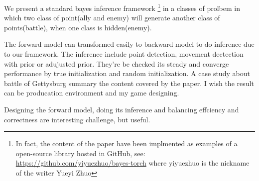 \documentclass{article}
\begin{document}
We present a standard bayes inference framework 
\footnote{In fact, the content of the paper have been implmented as examples of a open-source library
hosted in GitHub, see: \url{https://github.com/yiyuezhuo/bayes-torch} where yiyuezhuo is the nickname of
the writer Yueyi Zhuo} 
in a classes of prolbem in which 
two class of point(ally and enemy) will generate another class of points(battle), 
when one class is hidden(enemy).

The forward model can transformed easily to backward model to do inference due to our framework.
The inference include point detection, movement dectection with prior or adujusted prior.
They're be checked its steady and converge performance by true initialization and random initialization.
A case study about battle of Gettysburg summary the content covered by the paper. 
I wish the result can be producation environment and my game designing.

Designing the forward model, doing its inference and balancing effciency and correctness 
are interesting challenge, but useful.

 

\end{document}
